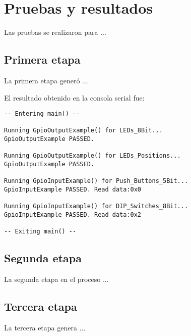 \chapter{Pruebas y resultados}
Las pruebas se realizaron para ...

\section{Primera etapa}
La primera etapa generó ...


El resultado obtenido en la consola serial fue:
\begin{verbatim}
-- Entering main() --

Running GpioOutputExample() for LEDs_8Bit...
GpioOutputExample PASSED.

Running GpioOutputExample() for LEDs_Positions...
GpioOutputExample PASSED.

Running GpioInputExample() for Push_Buttons_5Bit...
GpioInputExample PASSED. Read data:0x0

Running GpioInputExample() for DIP_Switches_8Bit...
GpioInputExample PASSED. Read data:0x2

-- Exiting main() --
\end{verbatim}




\section{Segunda etapa}
La segunda etapa en el proceso ...



\section{Tercera etapa}
La tercera etapa genera ...